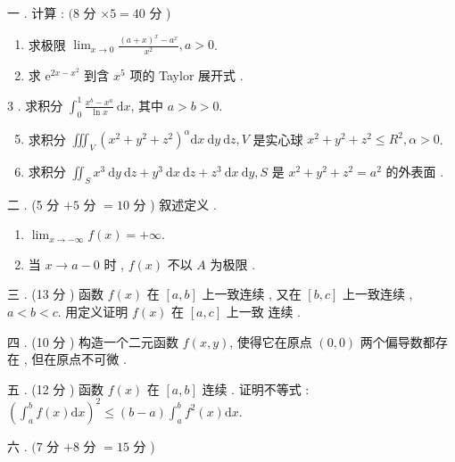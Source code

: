 \documentclass[10pt]{article}
\begin{document}
 一 .  计算 : $(8$  分  $\times 5=40$  分 )

\begin{enumerate}
  \item  求极限  $\lim _{x \rightarrow 0} \frac{(a+x)^{x}-a^{x}}{x^{2}}, a>0$.

  \item  求  $\mathrm{e}^{2 x-x^{2}}$  到含  $x^{5}$  项的  Taylor  展开式 .

\end{enumerate}
3 .  求积分  $\int_{0}^{1} \frac{x^{b}-x^{a}}{\ln x} \mathrm{~d} x$,  其中  $a>b>0$.

\begin{enumerate}
  \setcounter{enumi}{4}
  \item  求积分  $\iiint_{V}\left(x^{2}+y^{2}+z^{2}\right)^{\alpha} \mathrm{d} x \mathrm{~d} y \mathrm{~d} z, V$  是实心球  $x^{2}+y^{2}+z^{2} \leqslant R^{2}, \alpha>0$.

  \item  求积分  $\iint_{S} x^{3} \mathrm{~d} y \mathrm{~d} z+y^{3} \mathrm{~d} x \mathrm{~d} z+z^{3} \mathrm{~d} x \mathrm{~d} y, S$  是  $x^{2}+y^{2}+z^{2}=a^{2}$  的外表面 .

\end{enumerate}
 二 . (5  分  $+5$  分  $=10$  分 )  叙述定义 .

\begin{enumerate}
  \item $\lim _{x \rightarrow-\infty} f(x)=+\infty$.

  \item  当  $x \rightarrow a-0$  时 , $f(x)$  不以  $A$  为极限 .

\end{enumerate}
 三 . (13  分 )  函数  $f(x)$  在  $[a, b]$  上一致连续 ,  又在  $[b, c]$  上一致连续 , $a<b<c$.  用定义证明  $f(x)$  在  $[a, c]$  上一致   连续 .

 四 . (10  分 )  构造一个二元函数  $f(x, y)$,  使得它在原点  $(0,0)$  两个偏导数都存在 ,  但在原点不可微 .

 五 . (12  分 )  函数  $f(x)$  在  $[a, b]$  连续 .  证明不等式 : $\left(\int_{a}^{b} f(x) \mathrm{d} x\right)^{2} \leqslant(b-a) \int_{a}^{b} f^{2}(x) \mathrm{d} x$.

 六 . $(7$  分  $+8$  分  $=15$  分 )
\end{document}
